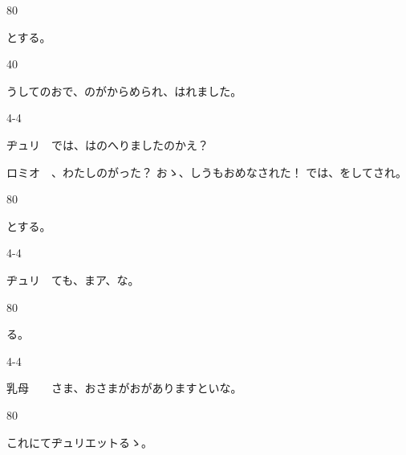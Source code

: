 \documentclass[tate,paper=b6j,jafontsize=9pt]{jlreq}
\begin{document}
\begin{azconvIndented}{8\zw}{0\zw}

とする。

\end{azconvIndented}
\begin{azconvIndented}{4\zw}{0\zw}

うしてのおで、のがからめられ、はれました。

\end{azconvIndented}
\begin{azconvIndented}{4\zw}{-4\zw}

ヂュリ　では、はのへりましたのかえ？

ロミオ　、わたしのがった？ おゝ、しうもおめなされた！ では、をしてされ。

\end{azconvIndented}
\begin{azconvIndented}{8\zw}{0\zw}

とする。

\end{azconvIndented}
\begin{azconvIndented}{4\zw}{-4\zw}

ヂュリ　ても、まア、な。

\end{azconvIndented}
\begin{azconvIndented}{8\zw}{0\zw}

る。

\end{azconvIndented}
\begin{azconvIndented}{4\zw}{-4\zw}

乳母　　さま、おさまがおがありますといな。

\end{azconvIndented}
\begin{azconvIndented}{8\zw}{0\zw}

これにてヂュリエットるゝ。

\end{azconvIndented}
\end{document}
